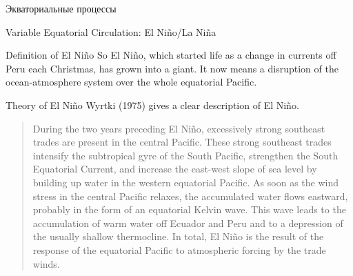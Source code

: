\begin{chapter}{Экваториальные процессы}
\begin{section}{Variable Equatorial Circulation: El Ni\~{n}o/La Ni\~{n}a}
\begin{paragraph}{Definition of El Ni\~{n}o}
So El Ni\~{n}o, which started life as a change in currents off Peru
each Christmas, has grown into a giant. It now means a disruption of
the ocean-atmosphere system over the whole equatorial Pacific.
%
\end{paragraph}

\begin{paragraph}{Theory of El Ni\~{n}o}
Wyrtki
(1975) gives a clear description of El Ni\~{n}o.
%
%
\begin{quote}
During the two years preceding El Ni\~{n}o, excessively strong
southeast trades are present in the central Pacific. These strong
southeast trades intensify the subtropical gyre of the South Pacific,
strengthen the South Equatorial Current, and increase the east-west
slope of sea level by building up water in the western equatorial
Pacific. As soon as the wind stress in
the central Pacific relaxes, the accumulated water flows eastward,
probably in the form of an equatorial Kelvin
wave. This wave leads to the accumulation of warm
water off Ecuador and Peru and to a depression of the usually shallow
thermocline. In total, El Ni\~{n}o is
the result of the response of the equatorial Pacific to atmospheric
forcing by the trade winds.
%
\end{quote}


\end{paragraph}
\end{section}
\end{chapter}
